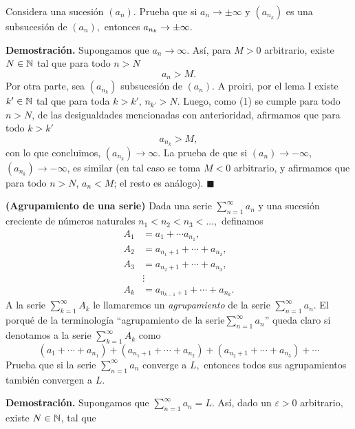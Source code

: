 \documentclass[11pt]{scrartcl}
\begin{document}
\begin{mdframed}[style=mdpurplebox, frametitle={Ejercicio 02, Tarea 10, Cálculo II}]
    Considera una sucesión $\left(a_{n}\right).$ Prueba que si $a_{n}\rightarrow\pm\infty$
    y $\left(a_{n_{k}}\right)$ es una subsucesión de $\left(a_{n}\right),$
    entonces $a_{n_{k}}\rightarrow\text{\ensuremath{\pm}}\infty.$
\end{mdframed}
\textbf{Demostración.} Supongamos que $a_n \rightarrow \infty$. Así, para $M>0$
arbitrario, existe $N\in \mathbb N$ tal que para todo $n > N$
\[
a_n > M. \tag{1}
\]
Por otra parte, sea $(a_{n_k})$ subsucesión de $(a_n)$. A proiri, por el lema I existe $k' \in \mathbb N$ tal que para toda $k > k'$, $n_{k'}>N$.  Luego, como (1)
se cumple para todo $n > N$, de las desigualdades mencionadas con anterioridad, afirmamos que para todo $k > k'$
\[
a_{n_k} > M,
\]
con lo que concluimos, $(a_{n_k}) \rightarrow \infty$. La prueba de que si $(a_n)\rightarrow -\infty$, $(a_{n_k})\rightarrow -\infty$, es similar
(en tal caso se toma $M < 0$ arbitrario, y afirmamos que para todo $n > N$, $a_n < M$; el resto es análogo). $\blacksquare$
\newpage
\begin{mdframed}[style=mdpurplebox, frametitle={Ejercicio 03, Tarea 10, Cálculo II}]
    \textbf{(Agrupamiento de una serie)} Dada una serie $\sum_{n=1}^{\infty}a_{n}$
    y una sucesión creciente de números naturales $n_{1}<n_{2}<n_{3}<...,$
    definamos 
    \begin{align*}
        A_{1} & =a_{1}+\cdots a_{n_{1}},\\
        A_{2} & =a_{n_{1}+1}+\cdots+a_{n_{2}},\\
        A_{3} & =a_{n_{2}+1}+\cdots+a_{n_{3}},\\
        & \vdots\\
        A_{k} & =a_{n_{k-1}+1}+\cdots+a_{n_{k}}.
    \end{align*}
    A la serie $\sum_{k=1}^{\infty}A_{k}$ le llamaremos un \textit{agrupamiento}
    de la serie $\sum_{n=1}^{\infty}a_{n}.$ El porqué de la terminología
    \enquote{agrupamiento de la serie$\sum_{n=1}^{\infty}a_{n}$} queda claro
    si denotamos a la serie $\sum_{k=1}^{\infty}A_{k}$ como 
    \[
    \left(a_{1}+\cdots+a_{n_{1}}\right)+\left(a_{n_{1}+1}+\cdots+a_{n_{2}}\right)+\left(a_{n_{2}+1}+\cdots+a_{n_{3}}\right)+\cdots
    \]
    Prueba que si la serie $\sum_{n=1}^{\infty}a_{n}$ converge a $L,$
    entonces todos sus agrupamientos también convergen a $L.$
\end{mdframed}
\textbf{Demostración.} Supongamos que $\sum_{n=1}^{\infty}a_n = L$. Así, dado un $\varepsilon > 0$ arbitrario, existe $N\in \mathbb N$, tal que
\end{document}
